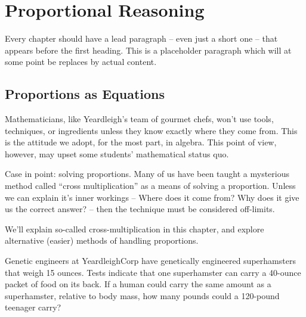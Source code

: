 \chapter{Proportional Reasoning}
\label{ch:proportions}



Every chapter should have a lead paragraph -- even just a short one -- that appears before the first heading. This is a placeholder paragraph which will at some point be replaces by actual content.

\section{Proportions as Equations}
\label{sec:propsaseqs}

Mathematicians, like Yeardleigh's team of gourmet chefs, won't use tools, techniques, or ingredients unless they know exactly where they come from. This is the attitude we adopt, for the most part, in algebra. This point of view, however, may upset some students' mathematical status quo.

Case in point: solving proportions. Many of us have been taught a mysterious method called ``cross multiplication'' as a means of solving a proportion. Unless we can explain it's inner workings -- Where does it come from? Why does it give us the correct answer? -- then the technique must be considered off-limits.

We'll explain so-called cross-multiplication in this chapter, and explore alternative (easier) methods of handling proportions.

\begin{boxedexplore}
\end{boxedexplore}

\begin{boxedexplore}
Genetic engineers at YeardleighCorp have genetically engineered superhamsters that weigh 15 ounces. Tests indicate that one superhamster can carry a 40-ounce packet of food on its back. If a human could carry the same amount as a superhamster, relative to body mass, how many pounds could a 120-pound teenager carry?
\end{boxedexplore}

